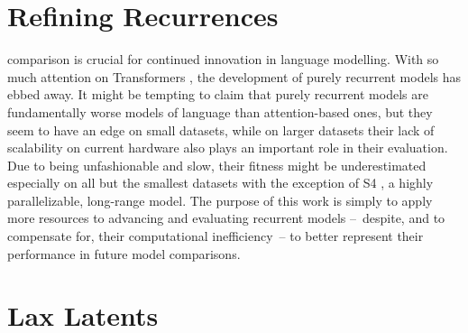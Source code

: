 \documentclass[12pt,a4paper,oneside]{book}
\begin{document}



\chapter{Refining Recurrences}
\label{sec:refining-recurrences}

comparison is crucial for continued innovation in language modelling.
With so much attention on Transformers \citep{vaswani2017attention}, the development of purely recurrent models has ebbed away.
It might be tempting to claim that purely recurrent models are fundamentally worse models of language than attention-based ones, but they seem to have an edge on small datasets, while on larger datasets their lack of scalability on current hardware \citep{DBLP:journals/corr/abs-2009-06489} also plays an important role in their evaluation.
Due to being unfashionable and slow, their fitness might be underestimated especially on all but the smallest datasets with the exception of S4 \citep{gu2021efficiently}, a highly parallelizable, long-range model.
The purpose of this work is simply to apply more resources to advancing and evaluating recurrent models --~despite, and to compensate for, their computational inefficiency~-- to better represent their performance in future model comparisons.




\chapter{Lax Latents}
\label{sec:lax-latents}
\end{document}
